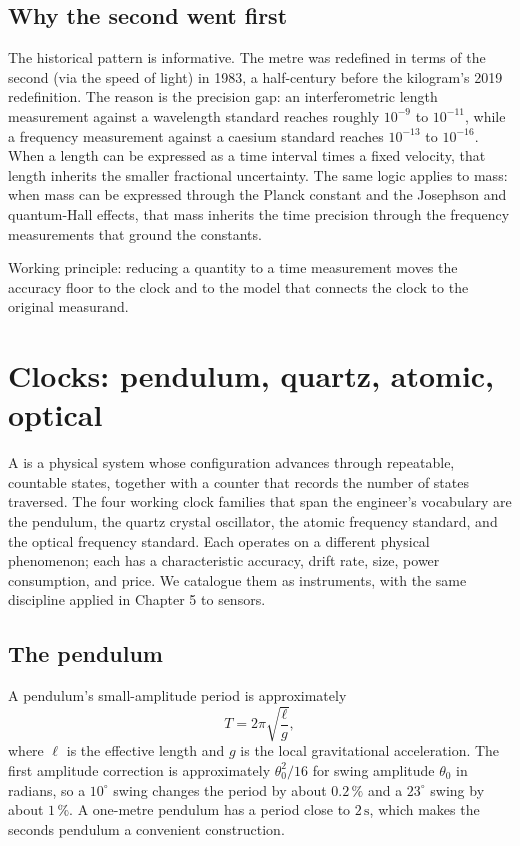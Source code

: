 \subsection{Why the second went first}

The historical pattern is informative. The metre was redefined in
terms of the second (via the speed of light) in 1983, a half-century
before the kilogram's 2019 redefinition. The reason is the precision
gap: an interferometric length measurement against a wavelength
standard reaches roughly $10^{-9}$ to $10^{-11}$, while a frequency
measurement against a caesium standard reaches $10^{-13}$ to
$10^{-16}$. When a length can be expressed as a time interval times
a fixed velocity, that length inherits the smaller fractional
uncertainty. The same logic applies to mass: when mass can be
expressed through the Planck constant and the Josephson and
quantum-Hall effects, that mass inherits the time precision through
the frequency measurements that ground the constants.

Working principle: reducing a quantity to a time measurement moves
the accuracy floor to the clock and to the model that connects the
clock to the original measurand.

\section{Clocks: pendulum, quartz, atomic, optical}

A  is a physical system whose configuration advances
through repeatable, countable states, together with a counter that
records the number of states traversed. The four working clock
families that span the engineer's vocabulary are the pendulum, the
quartz crystal oscillator, the atomic frequency standard, and the
optical frequency standard. Each operates on a different physical
phenomenon; each has a characteristic accuracy, drift rate, size,
power consumption, and price. We catalogue them as instruments, with
the same discipline applied in Chapter 5 to sensors.

\subsection{The pendulum}

A pendulum's small-amplitude period is approximately
\[
T = 2\pi \sqrt{\frac{\ell}{g}},
\]
where $\ell$ is the effective length and $g$ is the local
gravitational acceleration. The first amplitude correction is
approximately $\theta_{0}^{2}/16$ for swing amplitude $\theta_{0}$
in radians, so a $10^{\circ}$ swing changes the period by about
$0.2\,\%$ and a $23^{\circ}$ swing by about $1\,\%$. A one-metre
pendulum has a period close to $2 \,\si{\second}$, which makes the
seconds pendulum a convenient construction.

